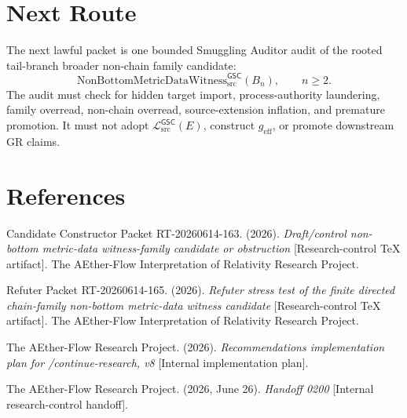 \documentclass[11pt]{article}
\newcommand{\Witness}{\mathrm{NonBottomMetricDataWitness}_{\mathrm{src}}^{\mathsf{GSC}}}
\newcommand{\MetricData}{\mathcal{L}_{\mathrm{src}}^{\mathsf{GSC}}}
\newcommand{\geff}{g_{\mathrm{eff}}}
\newcommand{\Bn}{B_n}
\begin{document}
\section{Next Route}
\label{next-route}

The next lawful packet is one bounded Smuggling Auditor audit of the rooted
tail-branch broader non-chain family candidate:
\[
\Witness(\Bn),\qquad n\ge 2.
\]
The audit must check for hidden target import, process-authority laundering,
family overread, non-chain overread, source-extension inflation, and premature
promotion. It must not adopt \(\MetricData(E)\), construct \(\geff\), or
promote downstream GR claims.

\section{References}
\label{references}

Candidate Constructor Packet RT-20260614-163. (2026). \textit{Draft/control
non-bottom metric-data witness-family candidate or obstruction}
[Research-control TeX artifact]. The AEther-Flow Interpretation of Relativity
Research Project.

Refuter Packet RT-20260614-165. (2026). \textit{Refuter stress test of the
finite directed chain-family non-bottom metric-data witness candidate}
[Research-control TeX artifact]. The AEther-Flow Interpretation of Relativity
Research Project.

The AEther-Flow Research Project. (2026). \textit{Recommendations
implementation plan for /continue-research, v8} [Internal implementation
plan].

The AEther-Flow Research Project. (2026, June 26). \textit{Handoff 0200}
[Internal research-control handoff].
\end{document}
